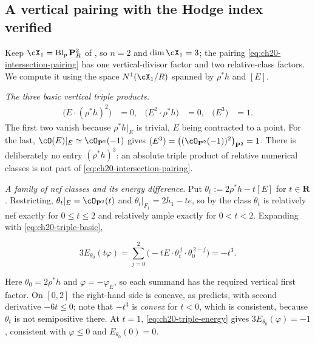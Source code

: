 \subsection{A vertical pairing with the Hodge index verified}
\label{sec:ch20-ex-hodge}

\begin{example}
\label{ex:ch20-triple-products}
Keep $\cX_1=\operatorname{Bl}_p\mathbf P^2_R$ of
, so $n=2$ and $\dim\cX_1=3$; the
pairing \eqref{eq:ch20-intersection-pairing} has one vertical-divisor factor
and two relative-class factors.  We compute it using the space
$N^1(\cX_1/R)$ spanned by $\rho^*h$ and $[E]$.

\emph{The three basic vertical triple products.}
\begin{align}
\label{eq:ch20-triple-basic}
 \bigl(E\cdot(\rho^*h)^2\bigr)&=0, &
 \bigl(E^2\cdot\rho^*h\bigr)&=0, &
 \bigl(E^3\bigr)&=1 .
\end{align}
The first two vanish because $\rho^*h|_E$ is trivial, $E$ being
contracted to a point.  For the last,
$\cO(E)|_E\simeq\cO_{\mathbf P^2}(-1)$ gives
$(E^3)=\bigl((\cO_{\mathbf P^2}(-1))^2\bigr)_{\mathbf P^2}=1$.
There is deliberately no entry $(\rho^*h)^3$: an absolute triple product
of relative numerical classes is not part of
\eqref{eq:ch20-intersection-pairing}.

\emph{A family of nef classes and its energy difference.}  Put
$\theta_t:=2\rho^*h-t[E]$ for $t\in\mathbf R$.  Restricting,
$\theta_t|_E=\cO_{\mathbf P^2}(t)$ and
$\theta_t|_{F_1}=2h_1-te$, so by
 the class $\theta_t$ is relatively nef
exactly for $0\leq t\leq2$ and relatively ample exactly for
$0<t<2$.  Expanding with \eqref{eq:ch20-triple-basic},

\begin{equation}
\label{eq:ch20-triple-energy}
 3E_{\theta_0}(t\varphi)
 =\sum_{j=0}^2\bigl(-tE\cdot\theta_t^{\,j}\cdot
                      \theta_0^{\,2-j}\bigr)
 =-t^3 .
\end{equation}

Here $\theta_0=2\rho^*h$ and $\varphi=-\varphi_E$, so each summand has
the required vertical first factor.  On $[0,2]$ the right-hand side is
concave, as  predicts, with second derivative
$-6t\leq0$; note that $-t^3$ is \emph{convex} for $t<0$, which is
consistent, because $\theta_t$ is not semipositive there.  At $t=1$,
\eqref{eq:ch20-triple-energy} gives
$3E_{\theta_0}(\varphi)=-1$, consistent with $\varphi\leq0$ and
$E_{\theta_0}(0)=0$.


\end{example}
